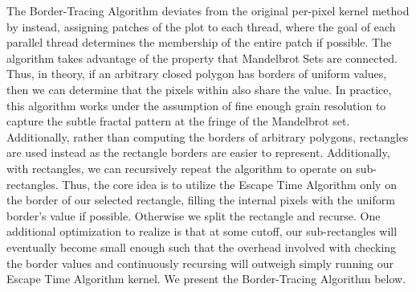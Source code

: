 \documentclass[letterpaper]{article}
\begin{document}
\begin{multicols}{2}
The Border-Tracing Algorithm deviates from the original per-pixel kernel method
  by instead, assigning patches of the plot to each thread, where the goal of
  each parallel thread determines the membership of the entire patch if
  possible. The algorithm takes advantage of the property that Mandelbrot Sets
  are connected. Thus, in theory, if an arbitrary closed polygon has borders of
  uniform values, then we can determine that the pixels within also share the
  value. 
In practice, this algorithm works under the assumption of fine enough grain
  resolution to capture the subtle fractal pattern at the fringe of the
  Mandelbrot set. Additionally, rather than computing the borders of arbitrary
  polygons, rectangles are used instead as the rectangle borders are easier to
  represent. Additionally, with rectangles, we can recursively repeat the
  algorithm to operate on sub-rectangles.
Thus, the core idea is to utilize the Escape Time Algorithm only on the border
  of our selected rectangle, filling the internal pixels with the uniform
  border's value if possible. Otherwise we split the rectangle and recurse.
One additional optimization to realize is that at some cutoff, our
  sub-rectangles will eventually become small enough such that the overhead
  involved with checking the border values and continuously recursing will
  outweigh simply running our Escape Time Algorithm kernel.
We present the Border-Tracing Algorithm below. 

\noindent{} \\


\end{multicols}
\end{document}
